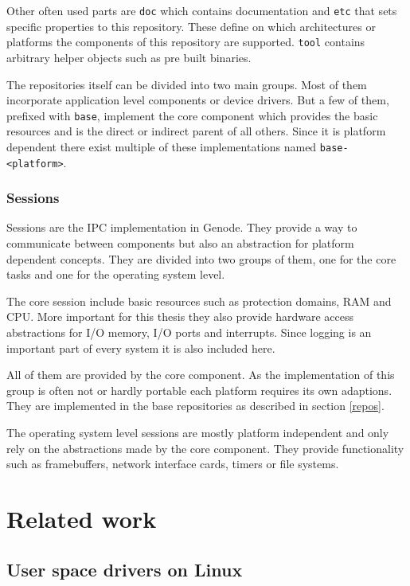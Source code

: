 \documentclass[
a4paper,
12pt,
notitlepage,
parskip=half,
DIV=11,
]{scrbook}
\begin{document}
		Other often used parts are \texttt{doc} which contains documentation and \texttt{etc} that sets specific properties to this repository.
		These define on which architectures or platforms the components of this repository are supported.
		\texttt{tool} contains arbitrary helper objects such as pre built binaries.
		
		The repositories itself can be divided into two main groups.
		Most of them incorporate application level components or device drivers.
		But a few of them, prefixed with \texttt{base}, implement the core component which provides the basic resources and is the direct or indirect parent of all others.
		Since it is platform dependent there exist multiple of these implementations named \texttt{base-<platform>}. \citep{genode}
		
		\subsection{Sessions}
		\label{sessions}
		
		Sessions are the IPC implementation in Genode.
		They provide a way to communicate between components but also an abstraction for platform dependent concepts.
		They are divided into two groups of them, one for the core tasks and one for the operating system level.
		
		The core session include basic resources such as protection domains, RAM and CPU.
		More important for this thesis they also provide hardware access abstractions for I/O memory, I/O ports and interrupts.
		Since logging is an important part of every system it is also included here.
		
		All of them are provided by the core component.
		As the implementation of this group is often not or hardly portable each platform requires its own adaptions.
		They are implemented in the base repositories as described in section \ref{repos}.
		
		The operating system level sessions are mostly platform independent and only rely on the abstractions made by the core component.
		They provide functionality such as framebuffers, network interface cards, timers or file systems. \citep{genode}
	
	\chapter{Related work}
		
		\section{User space drivers on Linux}
		
\end{document}
